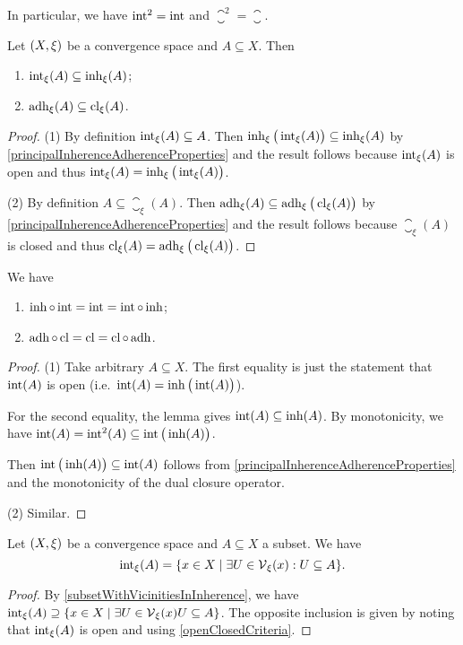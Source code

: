 In particular, we have $\operatorname{int}^2 = \operatorname{int}$ and $\closure^2 = \closure$.

\begin{lemma} \label{interiorInherenceInclusion}
Let $\left( X,\xi \right)$ be a convergence space and $A\subseteq X$. Then
\begin{enumerate}
\item $\operatorname{int}_\xi(A) \subseteq \operatorname{inh}_\xi(A)$;
\item $\operatorname{adh}_\xi(A) \subseteq \operatorname{cl}_\xi(A)$.
\end{enumerate}
\end{lemma}
\begin{proof}
(1) By definition $\operatorname{int}_\xi(A) \subseteq A$. Then $\operatorname{inh}_\xi\big(\operatorname{int}_\xi(A)\big) \subseteq \operatorname{inh}_\xi(A)$ by \ref{principalInherenceAdherenceProperties} and the result follows because $\operatorname{int}_\xi(A)$ is open and thus $\operatorname{int}_\xi(A) = \operatorname{inh}_\xi\big(\operatorname{int}_\xi(A)\big)$.

(2) By definition $A \subseteq \closure_\xi(A)$. Then $\operatorname{adh}_\xi(A) \subseteq \operatorname{adh}_\xi\big(\operatorname{cl}_\xi(A)\big)$ by \ref{principalInherenceAdherenceProperties} and the result follows because $\closure_\xi(A)$ is closed and thus $\operatorname{cl}_\xi(A) = \operatorname{adh}_\xi\big(\operatorname{cl}_\xi(A)\big)$.
\end{proof}
\begin{corollary} \label{interiorInherenceClosureAdherenceComposition}
We have
\begin{enumerate}
\item $\operatorname{inh} \circ \operatorname{int} = \operatorname{int} = \operatorname{int} \circ \operatorname{inh}$;
\item $\operatorname{adh}\circ \operatorname{cl} = \operatorname{cl} = \operatorname{cl} \circ \operatorname{adh}$.
\end{enumerate}
\end{corollary}
\begin{proof}
(1) Take arbitrary $A\subseteq X$. The first equality is just the statement that $\operatorname{int}(A)$ is open (i.e.\ $\operatorname{int}(A) = \operatorname{inh}\big(\operatorname{int}(A)\big)$).

For the second equality, the lemma gives $\operatorname{int}(A)\subseteq \operatorname{inh}(A)$. By monotonicity, we have $\operatorname{int}(A) = \operatorname{int}^2(A) \subseteq \operatorname{int}\big(\operatorname{inh}(A)\big)$.

Then $\operatorname{int}\big(\operatorname{inh}(A)\big) \subseteq \operatorname{int}(A)$ follows from \ref{principalInherenceAdherenceProperties} and the monotonicity of the dual closure operator.

(2) Similar.
\end{proof}

\begin{proposition}
Let $\left( X,\xi \right)$ be a convergence space and $A\subseteq X$ a subset. We have
\[ \interior_\xi(A) = \setbuilder{x\in X}{\exists U\in \vicinity_\xi(x): U\subseteq A}. \]
\end{proposition}
\begin{proof}
By \ref{subsetWithVicinitiesInInherence}, we have $\interior_\xi(A) \supseteq \setbuilder{x\in X}{\exists U\in \vicinity_\xi(x) U\subseteq A}$. The opposite inclusion is given by noting that $\operatorname{int}_\xi(A)$ is open and using \ref{openClosedCriteria}.
\end{proof}


